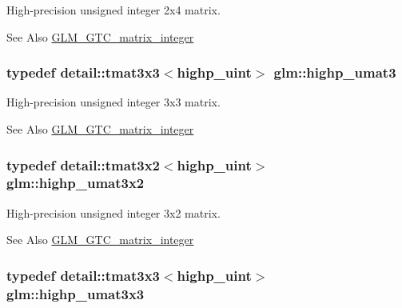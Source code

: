 High-\/precision unsigned integer 2x4 matrix. 

\begin{DoxySeeAlso}{See Also}
\hyperlink{group__gtc__matrix__integer}{G\-L\-M\-\_\-\-G\-T\-C\-\_\-matrix\-\_\-integer} 
\end{DoxySeeAlso}
\hypertarget{group__gtc__matrix__integer_ga0d2f0c76700809151e4582977bdc4c1d}{
\subsubsection[{highp\-\_\-umat3}]{\setlength{\rightskip}{0pt plus 5cm}typedef detail\-::tmat3x3$<$highp\-\_\-uint$>$ {\bf glm\-::highp\-\_\-umat3}}}\label{group__gtc__matrix__integer_ga0d2f0c76700809151e4582977bdc4c1d}


High-\/precision unsigned integer 3x3 matrix. 

\begin{DoxySeeAlso}{See Also}
\hyperlink{group__gtc__matrix__integer}{G\-L\-M\-\_\-\-G\-T\-C\-\_\-matrix\-\_\-integer} 
\end{DoxySeeAlso}
\hypertarget{group__gtc__matrix__integer_gae054a2e2dcecb6d435acc15a25d53ba5}{
\subsubsection[{highp\-\_\-umat3x2}]{\setlength{\rightskip}{0pt plus 5cm}typedef detail\-::tmat3x2$<$highp\-\_\-uint$>$ {\bf glm\-::highp\-\_\-umat3x2}}}\label{group__gtc__matrix__integer_gae054a2e2dcecb6d435acc15a25d53ba5}


High-\/precision unsigned integer 3x2 matrix. 

\begin{DoxySeeAlso}{See Also}
\hyperlink{group__gtc__matrix__integer}{G\-L\-M\-\_\-\-G\-T\-C\-\_\-matrix\-\_\-integer} 
\end{DoxySeeAlso}
\hypertarget{group__gtc__matrix__integer_ga0860bb2a1d49e039eac312c6ad4a1c65}{
\subsubsection[{highp\-\_\-umat3x3}]{\setlength{\rightskip}{0pt plus 5cm}typedef detail\-::tmat3x3$<$highp\-\_\-uint$>$ {\bf glm\-::highp\-\_\-umat3x3}}}\label{group__gtc__matrix__integer_ga0860bb2a1d49e039eac312c6ad4a1c65}


